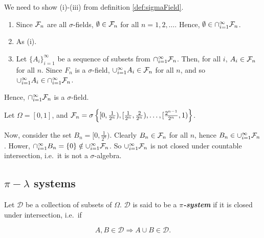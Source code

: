 \documentclass[]{book}
\providecommand{\tightlist}{%
  \setlength{\itemsep}{0pt}\setlength{\parskip}{0pt}}
\theoremstyle{definition}
\theoremstyle{definition}
\theoremstyle{definition}
\theoremstyle{remark}
\let\BeginKnitrBlock\begin \let\EndKnitrBlock\end
\begin{document}
\BeginKnitrBlock{solution}[\@ref(exr:ex11) a)]
\iffalse{} {Solution (\ref{exr:ex11} a)). } \fi{}We need to show
(i)-(iii) from definition \ref{def:sigmaField}.

\begin{enumerate}
\def\labelenumi{\roman{enumi})}
\tightlist
\item
  Since \(\mathcal{F}_n\) are all \(\sigma\)-fields, \(\emptyset \in \mathcal{F}_n\) for
  all \(n=1,2,\ldots\). Hence,
  \(\emptyset \in \cap_{i=1}^{\infty} \mathcal{F}_n\).
\item
  As (i).
\item
  Let \(\{A_i\}_{i=1}^\infty\) be a sequence of subsets from
  \(\cap_{i=1}^{\infty} \mathcal{F}_n\). Then, for all \(i\), \(A_i \in \mathcal{F}_n\)
  for all \(n\). Since \(F_n\) is a \(\sigma\)-field,
  \(\cup_{i=1}^\infty A_i \in \mathcal{F}_n\) for all \(n\), and so
  \(\cup_{i=1}^\infty A_i \in \cap_{i=1}^\infty \mathcal{F}_n\).
\end{enumerate}

Hence, \(\cap_{i=1}^\infty \mathcal{F}_n\) is a \(\sigma\)-field.
\EndKnitrBlock{solution}

\BeginKnitrBlock{solution}[\@ref(exr:ex11) b)]
\iffalse{} {Solution (\ref{exr:ex11} b)). } \fi{} Let
\(\Omega = [0,1]\), and
\(\mathcal{F}_n = \sigma \left\{[0,\tfrac{1}{2^n}),[\tfrac{1}{2^n},\tfrac{2}{2^n}), \ldots, [\tfrac{2^{n-1}}{2^n}, 1)\right\}\).

Now, consider the set \(B_n = [0, \tfrac{1}{2^n})\). Clearly
\(B_n \in \mathcal{F}_n\) for all \(n\), hence
\(B_n \in \cup_{i=1}^\infty \mathcal{F}_n\). Hower,
\(\cap_{i = 1}^{\infty} B_n = \{0\} \notin \cup_{i=1}^\infty \mathcal{F}_n\). So
\(\cup_{i=1}^\infty \mathcal{F}_n\) is not closed under countable intersection,
i.e.~it is not a \(\sigma\)-algebra.
\EndKnitrBlock{solution}

\subsection{\texorpdfstring{\(\pi-\lambda\)
systems}{\textbackslash{}pi-\textbackslash{}lambda systems}}\label{pi-lambda-systems}

\BeginKnitrBlock{definition}[$\pi$-system]
\protect\hypertarget{def:pi-system}{}{\label{def:pi-system}
\iffalse (\(\pi\)-system) \fi{} }Let \(\mathcal{D}\) be a collection of
subsets of \(\Omega\). \(\mathcal{D}\) is said to be a
\textbf{\emph{\(\pi\)-system}} if it is closed under intersection,
i.e.~if

\[
  A,B \in \mathcal{D} \Rightarrow A \cup B \in \mathcal{D}.
\]
\EndKnitrBlock{definition}
\end{document}
